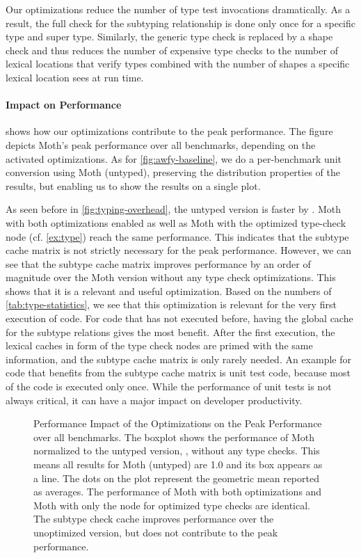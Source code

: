 Our optimizations reduce the number of type test invocations dramatically.
As a result, the full check for the subtyping relationship is done only once for
a specific type and super type.
Similarly, the generic type check is replaced by a shape check
and thus reduces the number of expensive type checks
to the number of lexical locations that verify types
combined with the number of shapes a specific lexical
location sees at run time.

\paragraph*{Impact on Performance}
\label{sec:eval-opt-perf}

 shows how our optimizations contribute
to the peak performance.
The figure depicts Moth's peak performance over
all benchmarks, depending on the activated optimizations.
As for \cref{fig:awfy-baseline},
we do a per-benchmark unit conversion using Moth (untyped),
preserving the distribution properties of the results,
but enabling us to show the results on a single plot.

As seen before in \cref{fig:typing-overhead}, the untyped version is faster by \OverheadTypingGMeanP.
Moth with both optimizations enabled as well as
Moth with the optimized type-check node (cf. \cref{ex:type})
reach the same performance.
This indicates that the subtype cache matrix is not strictly necessary for
the peak performance.
However, we can see that the subtype cache matrix improves performance
by an order of magnitude over the Moth version without any type check optimizations.
This shows that it is a relevant and useful optimization.
Based on the numbers of \cref{tab:type-statistics},
we see that this optimization is relevant for the very first execution of code.
For code that has not executed before,
having the global cache for the subtype relations gives the most benefit.
After the first execution, the lexical caches in form of the type check nodes
are primed with the same information, and the subtype cache matrix is only rarely needed.
An example for code that benefits from the subtype cache matrix is unit test code,
because most of the code is executed only once.
While the performance of unit tests is not always critical,
it can have a major impact on developer productivity.

\begin{figure}[htb]
  \centering
	\OptimizationOverview{}
  \caption{Performance Impact of the Optimizations on the Peak Performance over all benchmarks.
  The boxplot shows the performance of Moth normalized to the untyped version, \ie,
  without any type checks.
  This means all results for Moth (untyped) are 1.0 and its box appears as a line.
  The dots on the plot represent the geometric mean reported as averages.
  The performance of Moth with both optimizations and Moth
  with only the node for optimized type checks are identical.
  The subtype check cache improves performance over the unoptimized version,
  but does not contribute to the peak performance.
  }
	\label{fig:perf-impact-optimization}
\end{figure}

